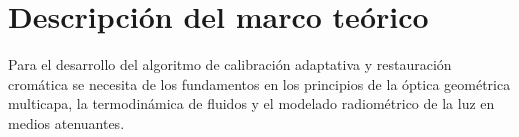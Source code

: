 \documentclass[12pt,letterpaper,spanish,twoside,openright]{report}
\begin{document}
\section{Descripción del marco teórico}

Para el desarrollo del algoritmo de calibración adaptativa y restauración cromática se necesita de los fundamentos en los principios de la óptica geométrica multicapa, la termodinámica de fluidos y el modelado radiométrico de la luz en medios atenuantes.
\end{document}

